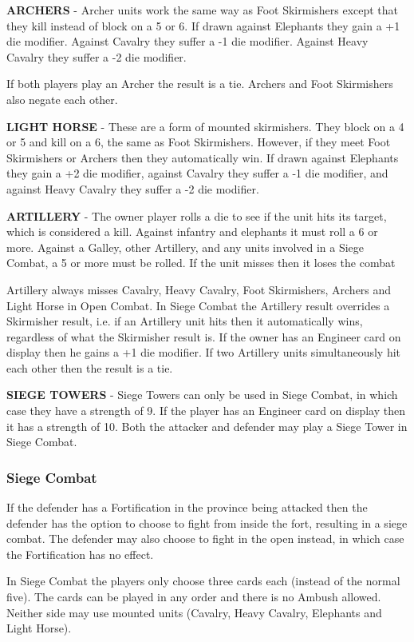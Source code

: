 \textbf{ARCHERS} - Archer units work the same way as Foot Skirmishers except that they kill instead of block on a 5 or 6. If drawn against Elephants they gain a +1 die modifier. Against Cavalry they suffer a -1 die modifier. Against Heavy Cavalry they suffer a -2 die modifier.

If both players play an Archer the result is a tie. Archers and Foot Skirmishers also negate each other.

\textbf{LIGHT HORSE} - These are a form of mounted skirmishers. They block on a 4 or 5 and kill on a 6, the same as Foot Skirmishers. However, if they meet Foot Skirmishers or Archers then they automatically win. If drawn against Elephants they gain a +2 die modifier, against Cavalry they suffer a -1 die modifier, and against Heavy Cavalry they suffer a -2 die modifier.

\textbf{ARTILLERY} - The owner player rolls a die to see if the unit hits its target, which is considered a kill. Against infantry and elephants it must roll a 6 or more. Against a Galley, other Artillery, and any units involved in a Siege Combat, a 5 or more must be rolled. If the unit misses then it loses the combat

Artillery always misses Cavalry, Heavy Cavalry, Foot Skirmishers, Archers and Light Horse in Open Combat. In Siege Combat the Artillery result overrides a Skirmisher result, i.e. if an Artillery unit hits then it automatically wins, regardless of what the Skirmisher result is. If the owner has an Engineer card on display then he gains a +1 die modifier. If two Artillery units simultaneously hit each other then the result is a tie.

\textbf{SIEGE TOWERS} - Siege Towers can only be used in Siege Combat, in which case they have a strength of 9. If the player has an Engineer card on display then it has a strength of 10. Both the attacker and defender may play a Siege Tower in Siege Combat.

\subsubsection{Siege Combat}

If the defender has a Fortification in the province being attacked then the defender has the option to choose to fight from inside the fort, resulting in a siege combat. The defender may also choose to fight in the open instead, in which case the Fortification has no effect.

In Siege Combat the players only choose three cards each (instead of the normal five). The cards can be played in any order and there is no Ambush allowed. Neither side may use mounted units (Cavalry, Heavy Cavalry, Elephants and Light Horse).

